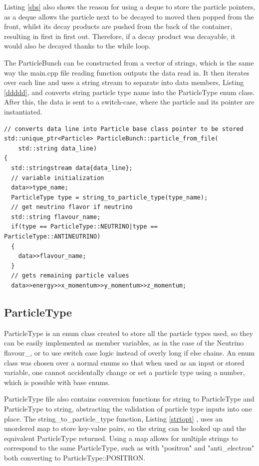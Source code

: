 \documentclass[11pt]{article} %
\begin{document}
Listing \ref{sbs} also shows the reason for using a deque to store the particle pointers, as a deque allows the particle next to be decayed to moved then popped from the front, whilst its decay products are pushed from the back of the container, resulting in first in first out. Therefore, if a decay product was decayable, it would also be decayed thanks to the while loop. 

The ParticleBunch can be constructed from a vector of strings, which is the same way the main.cpp file reading function outputs the data read in. It then iterates over each line and uses a string stream to separate into data members, 
Listing \ref{ddddd}, and converts string particle type name into the ParticleType enum class. After this, the data is sent to a switch-case, where the particle and its pointer are instantiated.
\begin{lstlisting}[firstnumber=108, caption={Code snippet of logic used to get particles from data file lines, variable initialization not included for clarity.}, label=ddddd]
// converts data line into Particle base class pointer to be stored
std::unique_ptr<Particle> ParticleBunch::particle_from_file(
	std::string data_line)
{
  std::stringstream data{data_line};
  // variable initialization
  data>>type_name;
  ParticleType type = string_to_particle_type(type_name);
  // get neutrino flavor if neutrino
  std::string flavour_name;
  if(type == ParticleType::NEUTRINO|type == ParticleType::ANTINEUTRINO)
  {
    data>>flavour_name;
  }
  // gets remaining particle values
  data>>energy>>x_momentum>>y_momentum>>z_momentum;
\end{lstlisting}
\subsection{ParticleType}

ParticleType is an enum class created to store all the particle types used, so they can be easily implemented as member variables, as in the case of the Neutrino flavour\_, or to use switch case logic instead of overly long if else chains. An enum class was chosen over a normal enums so that when used as an input or stored variable, one cannot accidentally change or set a particle type using a number, which is possible with base enums. 

ParticleType 
 file also
contains conversion functions for string to ParticleType and ParticleType to string, abstracting the validation of particle type inputs into one place. The 
string\_to\_particle\_type function, Listing \ref{strtopt} , uses an unordered map to store key-value pairs, so the string can be looked up and the equivalent ParticleType returned. Using a map allows for multiple strings to correspond to the same ParticleType, such as with "positron" and "anti\_electron" both converting to ParticleType::POSITRON.
\end{document}

